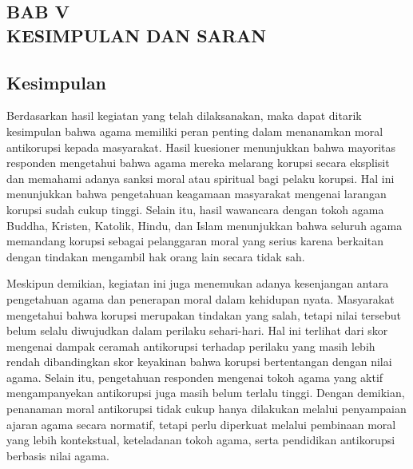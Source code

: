 \newpage

\renewcommand\thesection{5}
\renewcommand\thesubsection{\arabic{subsection}}

\setcounter{subsection}{0}

\begin{center}
    \section*{\textbf{BAB V \\ KESIMPULAN DAN SARAN}}
\end{center}

\subsection{Kesimpulan}
Berdasarkan hasil kegiatan yang telah dilaksanakan, maka dapat ditarik kesimpulan bahwa agama memiliki peran penting dalam menanamkan moral antikorupsi kepada masyarakat. Hasil kuesioner menunjukkan bahwa mayoritas responden mengetahui bahwa agama mereka melarang korupsi secara eksplisit dan memahami adanya sanksi moral atau spiritual bagi pelaku korupsi. Hal ini menunjukkan bahwa pengetahuan keagamaan masyarakat mengenai larangan korupsi sudah cukup tinggi. Selain itu, hasil wawancara dengan tokoh agama Buddha, Kristen, Katolik, Hindu, dan Islam menunjukkan bahwa seluruh agama memandang korupsi sebagai pelanggaran moral yang serius karena berkaitan dengan tindakan mengambil hak orang lain secara tidak sah.

Meskipun demikian, kegiatan ini juga menemukan adanya kesenjangan antara pengetahuan agama dan penerapan moral dalam kehidupan nyata. Masyarakat mengetahui bahwa korupsi merupakan tindakan yang salah, tetapi nilai tersebut belum selalu diwujudkan dalam perilaku sehari-hari. Hal ini terlihat dari skor mengenai dampak ceramah antikorupsi terhadap perilaku yang masih lebih rendah dibandingkan skor keyakinan bahwa korupsi bertentangan dengan nilai agama. Selain itu, pengetahuan responden mengenai tokoh agama yang aktif mengampanyekan antikorupsi juga masih belum terlalu tinggi. Dengan demikian, penanaman moral antikorupsi tidak cukup hanya dilakukan melalui penyampaian ajaran agama secara normatif, tetapi perlu diperkuat melalui pembinaan moral yang lebih kontekstual, keteladanan tokoh agama, serta pendidikan antikorupsi berbasis nilai agama.


